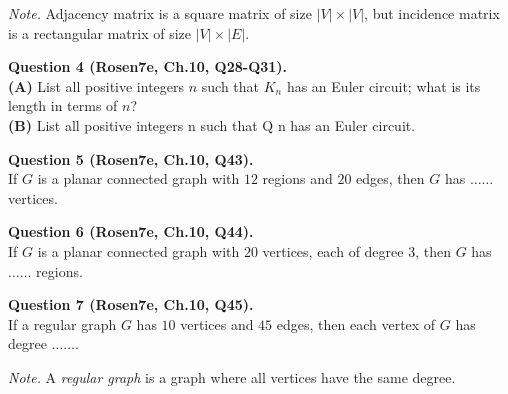 \documentclass[jou]{apa6}
\begin{document}
{\em Note.} Adjacency matrix is a square matrix of size $|V| \times |V|$, 
but incidence matrix is a rectangular matrix of size $|V| \times |E|$.

\vspace{10pt}
{\bf Question 4 (Rosen7e, Ch.10, Q28-Q31).}\\
{\bf (A)} List all positive integers $n$ such that $K_n$ has an Euler circuit; 
what is its length in terms of $n$?\\
{\bf (B)} List all positive integers n such that Q n has an Euler circuit.



\vspace{10pt}
{\bf Question 5 (Rosen7e, Ch.10, Q43).}\\
If $G$ is a planar connected graph with $12$ regions and $20$ edges, then $G$ has $\ldots\ldots$ vertices.


\vspace{10pt}
{\bf Question 6 (Rosen7e, Ch.10, Q44).}\\
If $G$ is a planar connected graph with $20$ vertices, each of degree $3$, then $G$ has $\ldots\ldots$ regions.

\vspace{10pt}
{\bf Question 7 (Rosen7e, Ch.10, Q45).}\\
If a regular graph $G$ has $10$ vertices and $45$ edges, then each vertex of $G$ has degree $\ldots\ldots$.

{\em Note.} A {\em regular graph} is a graph where all vertices have the same degree.
\end{document}
